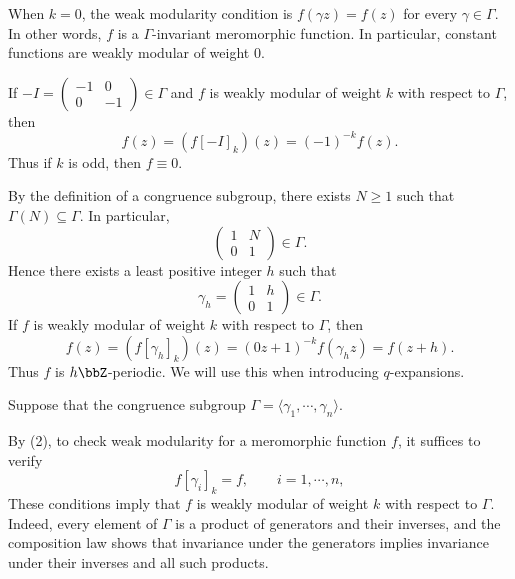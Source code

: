 \begin{remark}
    When $k = 0$, the weak modularity condition is $f(\gamma z) = f(z)$ for every $\gamma \in \Gamma$. In other words, $f$ is a $\Gamma$-invariant meromorphic function. In particular, constant functions are weakly modular of weight $0$.
\end{remark}

\begin{remark}
    If $ - I = \begin{pmatrix} - 1 & 0\\ 0 & - 1\end{pmatrix} \in \Gamma$ and $f$ is weakly modular of weight $k$ with respect to $\Gamma$, then
    \[
        f(z) = (f[-I]_k)(z) = (-1)^{-k}f(z).
    \]
    Thus if $k$ is odd, then $f \equiv 0$.
\end{remark}

\begin{remark}\label{Rmk:MF_period}
    By the definition of a congruence subgroup, there exists $N \geqslant 1$ such that $\Gamma(N) \subseteq \Gamma$. In particular,
    \[
        \begin{pmatrix}1 & N\\ 0 & 1\end{pmatrix} \in \Gamma.
    \]
    Hence there exists a least positive integer $h$ such that
    \[
        \gamma_h = \begin{pmatrix}1 & h\\ 0 & 1\end{pmatrix} \in \Gamma.
    \]
    If $f$ is weakly modular of weight $k$ with respect to $\Gamma$, then
    \[
        f(z) = (f[\gamma_h]_k)(z) = (0z + 1)^{-k}f(\gamma_hz) = f(z + h).
    \]
    Thus $f$ is $h\bbZ$-periodic. We will use this when introducing $q$-expansions.
\end{remark}

\begin{remark}
    Suppose that the congruence subgroup $\Gamma = \langle\gamma_1, \cdots, \gamma_n\rangle$.
    
    By (2), to check weak modularity for a meromorphic function $f$, it suffices to verify
    \[
        f[\gamma_i]_k = f, \qquad i = 1, \cdots, n,
    \]
    These conditions imply that $f$ is weakly modular of weight $k$ with respect to $\Gamma$. Indeed, every element of $\Gamma$ is a product of generators and their inverses, and the composition law shows that invariance under the generators implies invariance under their inverses and all such products.
\end{remark}

